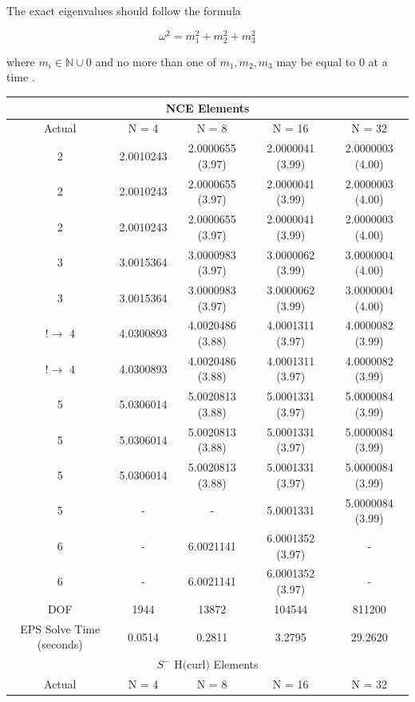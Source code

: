 \documentclass[manuscript,screen]{acmart}
\newcommand{\akg}[1]{\textcolor{blue}{\textbf{AG:} #1}}
\begin{document}
\noindent The exact eigenvalues should follow the formula

\[ \omega^2 = m_1^2 + m_2^2 + m_3^2 \]

\noindent where $m_i \in \mathbb{N} \cup {0}$ and no more than one of $m_1, m_2, m_3$ may be equal to $0$ at a time \cite{rognes2010efficient}.


\begin{center}
\begin{table}
\begin{tabular}{ c c c c c }
\multicolumn{5}{c}{NCE Elements} \\
\hline
Actual & N = 4 & N = 8 & N = 16 & N = 32 \\ 
\hline
2 &2.0010243 & 2.0000655 (3.97) & 2.0000041 (3.99) & 2.0000003 (4.00) \\  
2 & 2.0010243 & 2.0000655 (3.97) & 2.0000041 (3.99) & 2.0000003 (4.00)  \\
2 & 2.0010243 & 2.0000655 (3.97) & 2.0000041 (3.99) & 2.0000003 (4.00)\\
3 & 3.0015364 & 3.0000983 (3.97) & 3.0000062 (3.99) & 3.0000004 (4.00) \\
3 & 3.0015364 & 3.0000983 (3.97) & 3.0000062 (3.99) & 3.0000004 (4.00) \\
$! \rightarrow$ 4 & 4.0300893 & 4.0020486 (3.88) & 4.0001311 (3.97) & 4.0000082 (3.99) \\
$! \rightarrow$ 4 & 4.0300893 & 4.0020486 (3.88) & 4.0001311 (3.97) & 4.0000082 (3.99) \\
5 & 5.0306014 & 5.0020813 (3.88)& 5.0001331 (3.97) & 5.0000084 (3.99) \\
5 & 5.0306014 & 5.0020813 (3.88)& 5.0001331 (3.97) & 5.0000084 (3.99) \\
5 & 5.0306014 & 5.0020813 (3.88) & 5.0001331 (3.97) & 5.0000084 (3.99) \\
5 & - & - & 5.0001331 & 5.0000084 (3.99) \\
6 & - & 6.0021141 & 6.0001352 (3.97) & -  \\
6 & - & 6.0021141 & 6.0001352 (3.97) & - \\
\hline
DOF  & 1944 & 13872 & 104544 & 811200 \\
\hline
EPS Solve Time (seconds) & 0.0514 & 0.2811 & 3.2795 & 29.2620 \\
\hline
\multicolumn{5}{c}{$S^-$ H$($curl$)$ Elements} \\
\hline
Actual & N = 4 & N = 8 & N = 16 & N = 32 \\ 

\end{tabular}
\end{table}
\end{center}
\end{document}
